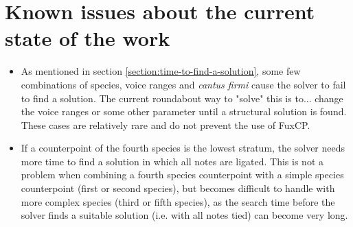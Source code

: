 \section{Known issues about the current state of the work}
\begin{itemize}
  \item As mentioned in section \ref{section:time-to-find-a-solution}, some few combinations of species, voice ranges and \textit{cantus firmi} cause the solver to fail to find a solution. The current roundabout way to "solve" this is to... change the voice ranges or some other parameter until a structural solution is found. These cases are relatively rare and do not prevent the use of FuxCP.
  \item If a counterpoint of the fourth species is the lowest stratum, the solver needs more time to find a solution in which all notes are ligated. This is not a problem when combining a fourth species counterpoint with a simple species counterpoint (first or second species), but becomes difficult to handle with more complex species (third or fifth species), as the search time before the solver finds a suitable solution (i.e. with all notes tied) can become very long.
\end{itemize}




